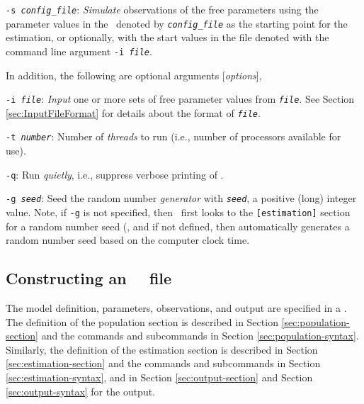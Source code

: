 \begin{description}
\item \texttt{-s \emph{config\_file}}:{\hspace{0.5cm} \emph{Simulate} observations of the free parameters using the parameter values in the \config\ denoted by \emph{\texttt{config\_file}} as the starting point for the estimation, or optionally, with the start values in the file denoted with the command line argument \texttt{-i \emph{file}}.}

\end{description}

In addition, the following are optional arguments [\emph{options}],

\begin{description}
\item \texttt{-i \emph{file}}:{\hspace*{0.5cm} \emph{Input} one or more sets of free parameter values from \texttt{\emph{file}}. See Section \ref{sec:InputFileFormat} for details about the format of \texttt{\emph{file}}.}

\item \texttt{-t \emph{number}}:{\hspace*{0.5cm} Number of \emph{threads} to run (i.e., number of processors available for use).}

\item \texttt{-q}:{\hspace*{0.5cm} Run \emph{quietly}, i.e., suppress verbose printing of \SPM.}

\item \texttt{-g \emph{seed}}:{\hspace*{0.5cm} Seed the random number \emph{generator} with \texttt{\emph{seed}}, a positive (long) integer value. Note, if \texttt{-g} is not specified, then \SPM\ first looks to the \texttt{[estimation]} section for a random number seed (, and if not defined, then automatically generates a random number seed based on the computer clock time.}
\end{description}

\subsection{Constructing an \SPM\ \config\ file\label{constructing-spm-config}}

The model definition, parameters, observations, and output are specified in a \config. The definition of the population section is described in Section \ref{sec:population-section} and the commands and subcommands in Section \ref{sec:population-syntax}. Similarly, the definition of the estimation section is described in Section \ref{sec:estimation-section} and the commands and subcommands in Section \ref{sec:estimation-syntax}, and in Section \ref{sec:output-section} and Section \ref{sec:output-syntax} for the output. 

